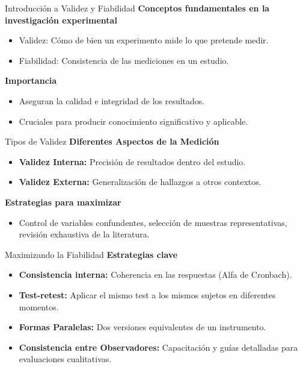 ﻿\documentclass{beamer}
\begin{document}
\begin{frame}{Introducción a Validez y Fiabilidad}
    \textbf{Conceptos fundamentales en la investigación experimental}
    \begin{itemize}
        \item Validez: Cómo de bien un experimento mide lo que pretende medir.
        \item Fiabilidad: Consistencia de las mediciones en un estudio.
    \end{itemize}

    \textbf{Importancia}
    \begin{itemize}
        \item Aseguran la calidad e integridad de los resultados.
        \item Cruciales para producir conocimiento significativo y aplicable.
    \end{itemize}
\end{frame}

\begin{frame}{Tipos de Validez}
    \textbf{Diferentes Aspectos de la Medición}
    \begin{itemize}
        \item \textbf{Validez Interna:} Precisión de resultados dentro del estudio.
        \item \textbf{Validez Externa:} Generalización de hallazgos a otros contextos.
    \end{itemize}

    \textbf{Estrategias para maximizar}
    \begin{itemize}
        \item Control de variables confundentes, selección de muestras representativas, revisión exhaustiva de la literatura.
    \end{itemize}
\end{frame}

\begin{frame}{Maximizando la Fiabilidad}
    \textbf{Estrategias clave}
    \begin{itemize}
        \item \textbf{Consistencia interna:} Coherencia en las respuestas (Alfa de Cronbach).
        \item \textbf{Test-retest:} Aplicar el mismo test a los mismos sujetos en diferentes momentos.
        \item \textbf{Formas Paralelas:} Dos versiones equivalentes de un instrumento.
        \item \textbf{Consistencia entre Observadores:} Capacitación y guías detalladas para evaluaciones cualitativas.
    \end{itemize}
\end{frame}
\end{document}
